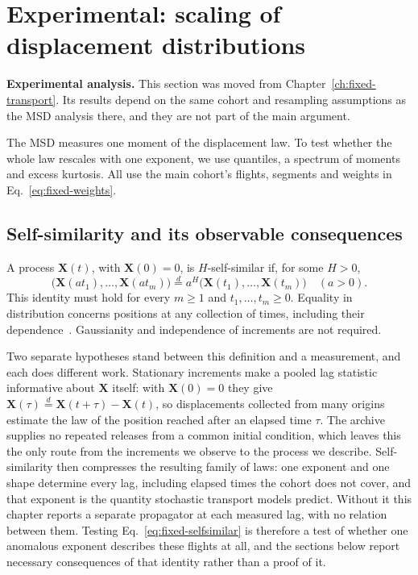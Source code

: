 \section{Experimental: scaling of displacement distributions}
\label{sec:fixed-scaling}

\noindent\textbf{Experimental analysis.}
This section was moved from Chapter~\ref{ch:fixed-transport}. Its results depend on
the same cohort and resampling assumptions as the MSD analysis there, and they are
not part of the main argument.

The MSD measures one moment of the displacement law. To test whether the whole law
rescales with one exponent, we use quantiles, a spectrum of moments and excess kurtosis.
All use the main cohort's flights, segments and weights in Eq.~\eqref{eq:fixed-weights}.

\subsection{Self-similarity and its observable consequences}
\label{sec:fixed-selfsimilar-definition}

A process $\boldsymbol X(t)$, with $\boldsymbol X(0)=0$, is $H$-self-similar if,
for some $H>0$,
\begin{equation}
 \bigl(\boldsymbol X(at_1),\ldots,\boldsymbol X(at_m)\bigr)
 \overset d= a^H\bigl(\boldsymbol X(t_1),\ldots,\boldsymbol X(t_m)\bigr)
 \quad(a>0).
 \label{eq:fixed-selfsimilar}
\end{equation}
This identity must hold for every $m\geq1$ and $t_1,\ldots,t_m\geq0$.
Equality in distribution concerns positions at any collection of times, including
their dependence~\cite{embrechts_maejima_selfsimilar}. Gaussianity and independence
of increments are not required.

Two separate hypotheses stand between this definition and a measurement, and each
does different work. Stationary increments make a pooled lag statistic informative
about $\boldsymbol X$ itself: with $\boldsymbol X(0)=0$ they give
$\boldsymbol X(\tau)\overset d=\boldsymbol X(t+\tau)-\boldsymbol X(t)$, so
displacements collected from many origins estimate the law of the position reached
after an elapsed time $\tau$. The archive supplies no repeated releases from a common
initial condition, which leaves this the only route from the increments we observe
to the process we describe. Self-similarity then compresses the resulting family of
laws: one exponent and one shape determine every lag, including elapsed times the
cohort does not cover, and that exponent is the quantity stochastic transport
models predict. Without it this chapter reports a separate
propagator at each measured lag, with no relation between them. Testing
Eq.~\eqref{eq:fixed-selfsimilar} is therefore a test of whether one anomalous
exponent describes these flights at all, and the sections below report necessary
consequences of that identity rather than a proof of it.

